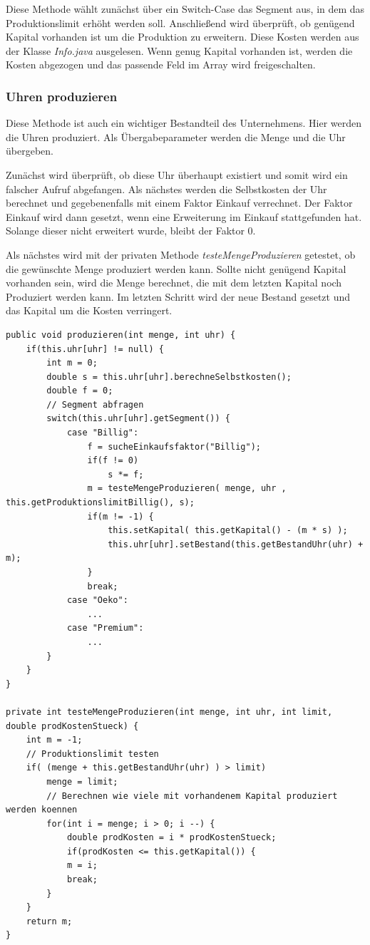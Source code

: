 Diese Methode wählt zunächst über ein Switch-Case das Segment aus, in dem das Produktionslimit erhöht werden soll. Anschließend wird überprüft, ob genügend Kapital vorhanden ist um die Produktion zu erweitern. Diese Kosten werden aus der Klasse \textit{Info.java} ausgelesen. Wenn genug Kapital vorhanden ist, werden die Kosten abgezogen und das passende Feld im Array wird freigeschalten.

\subsubsection{Uhren produzieren}
Diese Methode ist auch ein wichtiger Bestandteil des Unternehmens. Hier werden die Uhren produziert. Als Übergabeparameter werden die Menge und die Uhr übergeben. 

Zunächst wird überprüft, ob diese Uhr überhaupt existiert und somit wird ein falscher Aufruf abgefangen. Als nächstes werden die Selbstkosten der Uhr berechnet und gegebenenfalls mit einem Faktor Einkauf verrechnet. Der Faktor Einkauf wird dann gesetzt, wenn eine Erweiterung im Einkauf stattgefunden hat. Solange dieser nicht erweitert wurde, bleibt der Faktor 0.

Als nächstes wird mit der privaten Methode \textit{testeMengeProduzieren} getestet, ob die gewünschte Menge produziert werden kann. Sollte nicht genügend Kapital vorhanden sein, wird die Menge berechnet, die mit dem letzten Kapital noch Produziert werden kann. Im letzten Schritt wird der neue Bestand gesetzt und das Kapital um die Kosten verringert.

\lstset{language=Java} 
\begin{lstlisting}
public void produzieren(int menge, int uhr) {
	if(this.uhr[uhr] != null) {
		int m = 0;
		double s = this.uhr[uhr].berechneSelbstkosten();
		double f = 0;
		// Segment abfragen
		switch(this.uhr[uhr].getSegment()) {
			case "Billig":
				f = sucheEinkaufsfaktor("Billig");
				if(f != 0)
					s *= f;
				m = testeMengeProduzieren( menge, uhr , this.getProduktionslimitBillig(), s);
				if(m != -1) {
					this.setKapital( this.getKapital() - (m * s) );
					this.uhr[uhr].setBestand(this.getBestandUhr(uhr) + m);
				}
				break;
			case "Oeko":
				...
			case "Premium":
				...
		}
	}
}

private int testeMengeProduzieren(int menge, int uhr, int limit, double prodKostenStueck) {
	int m = -1;
	// Produktionslimit testen
	if( (menge + this.getBestandUhr(uhr) ) > limit)
		menge = limit;
		// Berechnen wie viele mit vorhandenem Kapital produziert werden koennen
		for(int i = menge; i > 0; i --) {
			double prodKosten = i * prodKostenStueck;
			if(prodKosten <= this.getKapital()) {
			m = i;
			break;
		}
	}
	return m;
}
\end{lstlisting}

